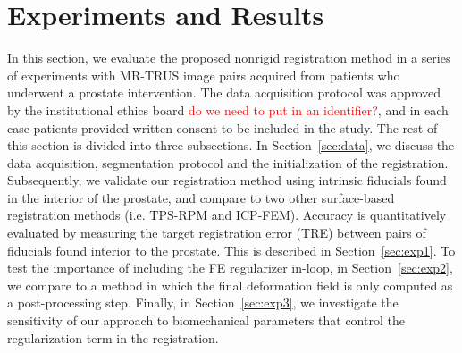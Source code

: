 \documentclass[journal]{IEEEtran}
\newcommand{\comment}[1]{\textcolor{red}{#1}}
\begin{document}
\section{Experiments and Results}
In this section, we evaluate the proposed nonrigid registration method in a series of experiments with MR-TRUS image pairs acquired from patients who underwent a prostate intervention. The data acquisition protocol was approved by the institutional ethics board \comment{do we need to put in an identifier?}, and in each case patients provided written consent to be included in the study. The rest of this section is divided into three subsections. In Section~\ref{sec:data}, we discuss the data acquisition, segmentation protocol and the initialization of the registration. Subsequently, we validate our registration method using intrinsic fiducials found in the interior of the prostate, and compare to two other surface-based registration methods (i.e. TPS-RPM and ICP-FEM). Accuracy is quantitatively evaluated by measuring the target registration error (TRE) between pairs of fiducials found interior to the prostate. This is described in Section~\ref{sec:exp1}. To test the importance of including the FE regularizer in-loop, in Section~\ref{sec:exp2}, we compare to a method in which the final deformation field is only computed as a post-processing step. Finally, in Section~\ref{sec:exp3}, we investigate the sensitivity of our approach to biomechanical parameters that control the regularization term in the registration.
\end{document}
